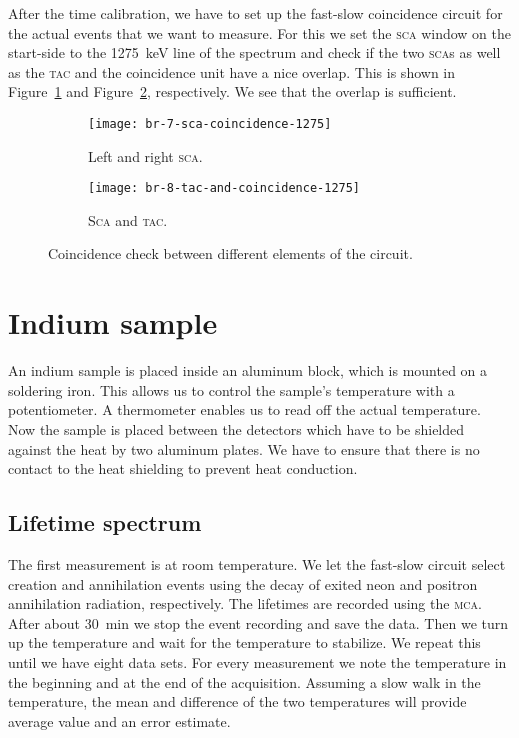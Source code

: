 \documentclass[11pt, english, fleqn, DIV=15, headinclude, BCOR=2cm]{scrreprt}
\begin{document}
After the time calibration, we have to set up the fast-slow coincidence circuit
for the actual events that we want to measure. For this we set the \textsc{sca}
window on the start-side to the \SI{1275}{\kilo\electronvolt} line of the
spectrum and check if the two \textsc{sca}s as well as the \textsc{tac} and the
coincidence unit have a nice overlap. This is shown in
Figure~\ref{fig:7-sca-coincidence-1275} and
Figure~\ref{fig:8-tac-and-coincidence-1275}, respectively. We see that the
overlap is sufficient.

\begin{figure}
    \centering
    \begin{subfigure}[c]{0.48\linewidth}
        \centering
        \texttt{[image: br-7-sca-coincidence-1275]}
        \caption{%
                Left and right \textsc{sca}.
        }
        \label{fig:7-sca-coincidence-1275}
    \end{subfigure}
    \hfill
    \begin{subfigure}[c]{0.48\linewidth}
        \centering
        \texttt{[image: br-8-tac-and-coincidence-1275]}
        \caption{%
                \textsc{Sca} and \textsc{tac}.
        }
        \label{fig:8-tac-and-coincidence-1275}
    \end{subfigure}
    \caption{%
        Coincidence check between different elements of the circuit.
    }
    \label{fig:}
\end{figure}

\section{Indium sample}

An indium sample is placed inside an aluminum block, which is mounted on a
soldering iron. This allows us to control the sample's temperature with a
potentiometer. A thermometer enables us to read off the actual temperature. Now
the sample is placed between the detectors which have to be shielded against
the heat by two aluminum plates. We have to ensure that there is no contact to
the heat shielding to prevent heat conduction. 

\subsection{Lifetime spectrum}

The first measurement is at room temperature. We let the fast-slow circuit
select creation and annihilation events using the decay of exited neon and
positron annihilation radiation, respectively. The lifetimes are recorded
using the \textsc{mca}. After about \SI{30}{\minute} we stop the event
recording and save the data. Then we turn up the temperature and wait for the
temperature to stabilize. We repeat this until we have eight data sets. For
every measurement we note the temperature in the beginning and at the end of
the acquisition. Assuming a slow walk in the temperature, the mean and
difference of the two temperatures will provide average value and an error
estimate.
\end{document}
